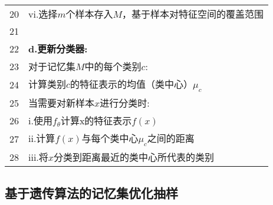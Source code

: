 \begin{table}[htbp]
\begin{tabularx}{1.0\textwidth}{cl}
   20&\quad\quad\quad vi.选择$m$个样本存入$M$，基于样本对特征空间的覆盖范围\\
   21&\\
   22&\quad\textbf{d.更新分类器:} \\
   23&\quad\quad 对于记忆集$M$中的每个类别$c$: \\
   24&\quad\quad\quad 计算类别$c$的特征表示的均值（类中心）$\mu_c$\\
   25&\quad\quad 当需要对新样本$x$进行分类时:\\
   26&\quad\quad\quad i.使用$f_{\theta}$计算x的特征表示$f(x)$\\
   27&\quad\quad\quad ii.计算$f(x)$与每个类中心$\mu_c$之间的距离\\
   28&\quad\quad\quad iii.将$x$分类到距离最近的类中心所代表的类别\\
   \bottomrule
   \end{tabularx}
  \end{table}

\subsection{基于遗传算法的记忆集优化抽样}




